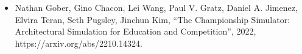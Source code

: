 
\begin{itemize}

    \item 
    
    \begin{sloppypar}
    Nathan Gober, Gino Chacon, Lei Wang, Paul V. Gratz, Daniel A. Jimenez, Elvira Teran, Seth Pugsley, Jinchun Kim, ``The Championship Simulator: Architectural Simulation for Education and Competition'', 2022,
    https://arxiv.org/abs/2210.14324.
    \end{sloppypar}

\end{itemize}

